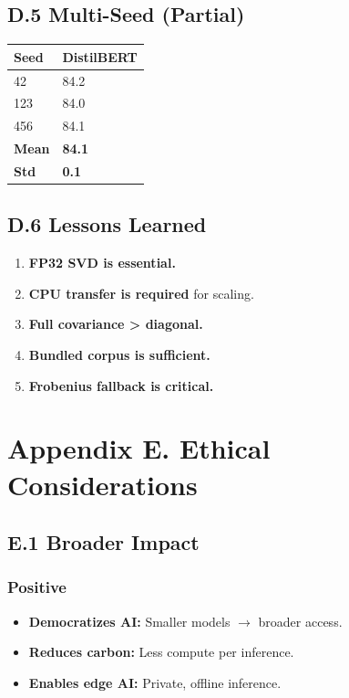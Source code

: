\subsection{D.5 Multi-Seed (Partial)}

\begin{table}[H]
\centering
\small
\begin{tabular}{ll}
\toprule
\textbf{Seed} & \textbf{DistilBERT} \\
\midrule
42 & 84.2 \\
123 & 84.0 \\
456 & 84.1 \\
\textbf{Mean} & \textbf{84.1} \\
\textbf{Std} & \textbf{0.1} \\
\bottomrule
\end{tabular}
\end{table}

\subsection{D.6 Lessons Learned}

\begin{enumerate}
\item \textbf{FP32 SVD is essential.}
\item \textbf{CPU transfer is required} for scaling.
\item \textbf{Full covariance > diagonal.}
\item \textbf{Bundled corpus is sufficient.}
\item \textbf{Frobenius fallback is critical.}
\end{enumerate}


\section{Appendix E. Ethical Considerations}

\subsection{E.1 Broader Impact}

\subsubsection{Positive}
\begin{itemize}
\item \textbf{Democratizes AI:} Smaller models $\to$ broader access.
\item \textbf{Reduces carbon:} Less compute per inference.
\item \textbf{Enables edge AI:} Private, offline inference.

\end{itemize}
